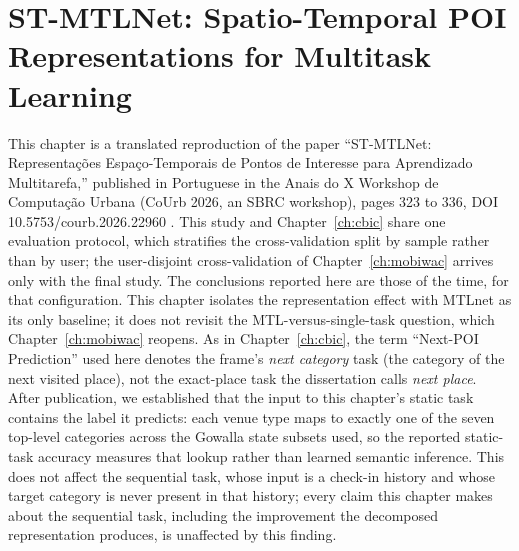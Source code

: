 \chapter[ST-MTLNet: Spatio-Temporal POI Representations]{ST-MTLNet: Spatio-Temporal POI Representations for Multitask Learning}
\label{ch:courb}

\begin{chapterpreface}
This chapter is a translated reproduction of the paper ``ST-MTLNet: Representações Espaço-Temporais de Pontos de Interesse para Aprendizado Multitarefa,'' published in Portuguese in the Anais do X Workshop de Computação Urbana (CoUrb 2026, an SBRC workshop), pages 323 to 336, DOI 10.5753/courb.2026.22960 \cite{paiva2026stmtlnet}. This study and Chapter~\ref{ch:cbic} share one evaluation protocol, which stratifies the cross-validation split by sample rather than by user; the user-disjoint cross-validation of Chapter~\ref{ch:mobiwac} arrives only with the final study. The conclusions reported here are those of the time, for that configuration. This chapter isolates the representation effect with MTLnet as its only baseline; it does not revisit the MTL-versus-single-task question, which Chapter~\ref{ch:mobiwac} reopens. As in Chapter~\ref{ch:cbic}, the term ``Next-POI Prediction'' used here denotes the frame's \emph{next category} task (the category of the next visited place), not the exact-place task the dissertation calls \emph{next place}. After publication, we established that the input to this chapter's static task contains the label it predicts: each venue type maps to exactly one of the seven top-level categories across the Gowalla state subsets used, so the reported static-task accuracy measures that lookup rather than learned semantic inference. This does not affect the sequential task, whose input is a check-in history and whose target category is never present in that history; every claim this chapter makes about the sequential task, including the improvement the decomposed representation produces, is unaffected by this finding.

\end{chapterpreface}
